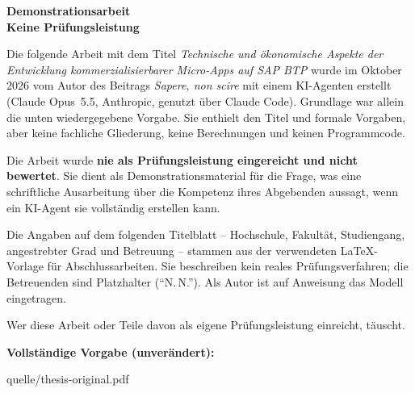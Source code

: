 \documentclass[11pt,a4paper]{article}
\newcommand{\vermerk}{%
  \begin{tikzpicture}[remember picture,overlay]
    \node[anchor=north,yshift=-5mm,fill=white,fill opacity=0.85,
          text opacity=1,inner sep=3pt,font=\sffamily\footnotesize,
          text=red!60!black]
      at (current page.north)
      {Demonstrationsarbeit -- mit KI erstellt -- keine Prüfungsleistung};
  \end{tikzpicture}}
\begin{document}
\begin{center}
  {\sffamily\bfseries\Large Demonstrationsarbeit\\[0.3em]
  Keine Prüfungsleistung\par}
\end{center}

\vspace{1em}
Die folgende Arbeit mit dem Titel \emph{Technische und ökonomische
Aspekte der Entwicklung kommerzialisierbarer Micro-Apps auf SAP BTP}
wurde im Oktober 2026 vom Autor des Beitrags \emph{Sapere, non
scire} mit einem KI-Agenten erstellt (Claude Opus~5.5, Anthropic,
genutzt über Claude Code). Grundlage war allein die unten
wiedergegebene Vorgabe. Sie enthielt den Titel und formale Vorgaben,
aber keine fachliche Gliederung, keine Berechnungen und keinen
Programmcode.

Die Arbeit wurde \textbf{nie als Prüfungsleistung eingereicht und
nicht bewertet}. Sie dient als Demonstrationsmaterial für die Frage,
was eine schriftliche Ausarbeitung über die Kompetenz ihres
Abgebenden aussagt, wenn ein KI-Agent sie vollständig erstellen kann.

Die Angaben auf dem folgenden Titelblatt -- Hochschule, Fakultät,
Studiengang, angestrebter Grad und Betreuung -- stammen aus der
verwendeten LaTeX-Vorlage für Abschlussarbeiten. Sie beschreiben
kein reales Prüfungsverfahren; die Betreuenden sind Platzhalter
(\enquote{N.\,N.}). Als Autor ist auf Anweisung das Modell
eingetragen.

Wer diese Arbeit oder Teile davon als eigene Prüfungsleistung
einreicht, täuscht.

\medskip
\textbf{Vollständige Vorgabe (unverändert):}
\begin{center}
\begin{minipage}{0.9\linewidth}

\end{minipage}
\end{center}

\clearpage
%
  {quelle/thesis-original.pdf}
\end{document}
